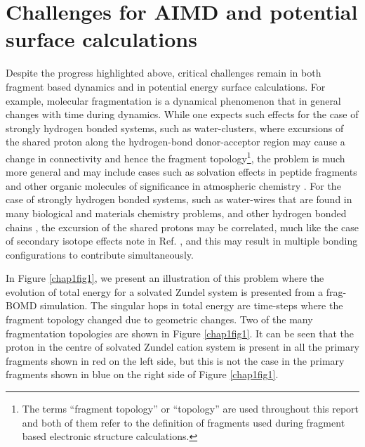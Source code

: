 \section{Challenges for AIMD and potential surface calculations}
Despite the progress highlighted above, critical challenges remain in
both fragment based dynamics and in potential energy surface calculations.
For example, molecular fragmentation is a dynamical phenomenon that in
general changes with time during dynamics. While one expects such effects for
the case of strongly hydrogen bonded systems, such as water-clusters, where
excursions of the shared proton along the hydrogen-bond donor-acceptor region may
cause a change in connectivity and hence the fragment topology\footnote{The terms
``fragment topology'' or ``topology'' are used throughout this report and
both of them refer to the definition of fragments  used during fragment based
electronic structure calculations.}, the problem is much more general and may
include cases such as solvation effects in peptide
fragments and other organic molecules of significance in atmospheric chemistry
\cite{isobut2D-water}. For the case of strongly hydrogen bonded systems,
such as water-wires that are found in many biological\cite{qmmmadmp,Roux,Sagnella,
pomesRoux1, nagle1978molecular, baciou1995interruption, takeshita2014x,
chamberlin2015mapping, sasaki2006voltage, ramsey2006voltage} and materials chemistry
problems\cite{mashl2003anomalously, si2011selective, mann2003water}, and other
hydrogen bonded chains \cite{Guo}, the excursion of the shared protons may be
correlated, much like the case of secondary isotope effects note in
Ref. \cite{SLO-rare-isotopes}, and this may result in multiple bonding
configurations to contribute simultaneously.

In Figure \ref{chap1fig1}, we present an illustration of this problem where the
evolution of total energy for a solvated Zundel system is presented from a
frag-BOMD simulation. The singular hops in total energy are time-steps
where the fragment topology changed due to geometric
changes. Two of the many fragmentation topologies are shown in Figure
\ref{chap1fig1}. It can be seen that the proton in the centre of solvated Zundel
cation system is present in all the primary fragments shown in red on the left
side, but this is not the case in the primary fragments shown in blue on the
right side of Figure \ref{chap1fig1}.


